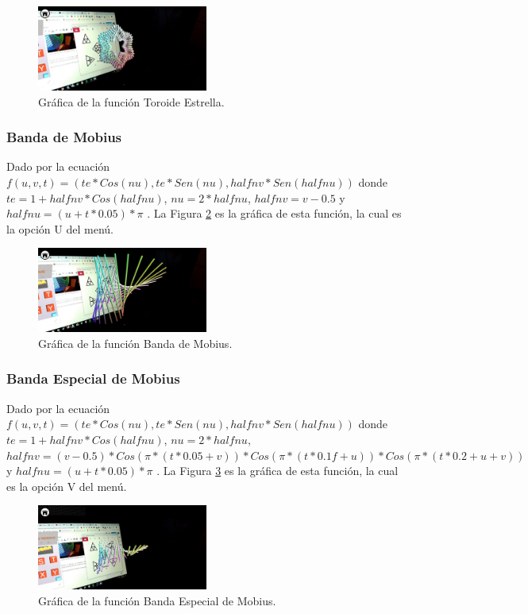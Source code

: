 \begin{figure}[hbt!]
\centering
\includegraphics[width=0.5\textwidth]{figuras/graficas/toroide_estrella.png}
\caption{\label{fig:graf_toroide_estrella}Gráfica de la función Toroide Estrella.}
\end{figure}
\FloatBarrier

\subsubsection{Banda de Mobius}
Dado por la ecuación $f(u,v,t)=(te*Cos(nu),te*Sen(nu),halfnv*Sen(halfnu))$ donde $te = 1 + halfnv * Cos(halfnu)$, $nu = 2 * halfnu$, $halfnv = v - 0.5$ y $halfnu = (u + t * 0.05) * \pi$ . La Figura \ref{fig:graf_mobius} es la gráfica de esta función, la cual es la opción U del menú.

\begin{figure}[hbt!]
\centering
\includegraphics[width=0.5\textwidth]{figuras/graficas/mobius.png}
\caption{\label{fig:graf_mobius}Gráfica de la función Banda de Mobius.}
\end{figure}
\FloatBarrier

\subsubsection{Banda Especial de Mobius}
Dado por la ecuación $f(u,v,t)=(te*Cos(nu),te*Sen(nu),halfnv*Sen(halfnu))$ donde $te = 1 + halfnv * Cos(halfnu)$, $nu = 2 * halfnu$, $halfnv = (v - 0.5) * Cos(\pi * (t * 0.05 + v)) * Cos(\pi * (t * 0.1f + u)) * Cos(\pi * (t * 0.2 + u + v))$ y $halfnu = (u + t * 0.05) * \pi$ . La Figura \ref{fig:graf_mobius_especial} es la gráfica de esta función, la cual es la opción V del menú.

\begin{figure}[hbt!]
\centering
\includegraphics[width=0.5\textwidth]{figuras/graficas/mobius_especial.png}
\caption{\label{fig:graf_mobius_especial}Gráfica de la función Banda Especial de Mobius.}
\end{figure}
\FloatBarrier

